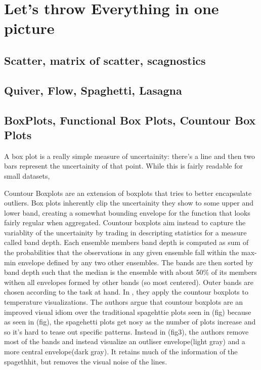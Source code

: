 \documentclass[letterpaper,onecolumn,titlepage]{Ythesis}
\begin{document}
\section{Let's throw Everything in one picture}                                                        
\subsection{Scatter, matrix of scatter, scagnostics}                                        
\subsection{Quiver, Flow, Spaghetti, Lasagna}
\subsection{BoxPlots, Functional Box Plots, Countour Box Plots}                                      
A box plot is a really simple measure of uncertainity: there's a line and then two bars represent the uncertainity of that point. %
While this is fairly readable for small datasets, %




Countour Boxplots \cite{Whitaker2013} are an extension of boxplots that tries to better encapsulate outliers. Box plots inherently clip the uncertainity they show to some upper and lower band, 
creating a somewhat bounding envelope for the function that looks fairly regular when aggregated. Countour boxplots aim instead to capture the variablity of the uncertainity by trading in descripting
statistics for a measure called band depth. Each ensemble members band depth is computed as sum of the probabilities that the observations in any given ensemble fall within the max-min envelope defined by any two other ensembles. The bands are then sorted by band depth such that the median is the ensemble with about 50\% of its members withen all envelopes formed by other bands (so most centered). Outer bands are chosen according to the task at hand. In \cite{Whitaker2013}, they apply the countour boxplots to temperature visualizations. %
The authors argue that countour boxplots are an improved visual idiom over the traditional spagehttie plots seen in (fig) because as seen in (fig), the spagehetti plots get nosy as the number of plots increase and so it's hard to tease out specific patterns. Instead in (fig3), the authors remove most of the bands and instead visualize an outliser envelope(light gray) and a more central envelope(dark gray). It retains much of the information of the spagethhit, but removes the visual noise of the lines.  
\end{document}
